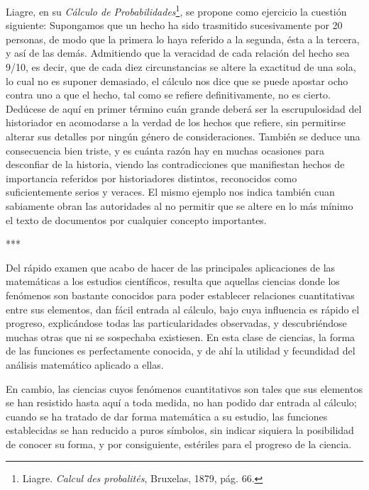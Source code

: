 \documentclass[a4paper, 12pt]{article}
\begin{document}
Liagre, en su {\it Cálculo de Probabilidades}\footnote{Liagre. {\it Calcul des probalités}, Bruxelas, 1879, pág. 66.}, se propone como ejercicio la cuestión siguiente: Supongamos que un hecho ha sido trasmitido sucesivamente por 20 personas, de modo que la primera lo haya referido a la segunda, ésta a la tercera, y así de las demás. Admitiendo que la veracidad de cada relación del hecho sea 9/10, es decir, que de cada diez circunstancias se altere la exactitud de una sola, lo cual no es suponer demasiado, el cálculo nos dice que se puede apostar ocho contra uno a que el hecho, tal como se refiere definitivamente, no es cierto. Dedúcese de aquí en primer término cuán grande deberá ser la escrupulosidad del historiador en acomodarse a la verdad de los hechos que refiere, sin permitirse alterar sus detalles por ningún género de consideraciones. También se deduce una consecuencia bien triste, y es cuánta razón hay en muchas ocasiones para desconfiar de la historia, viendo las contradicciones que manifiestan hechos de importancia referidos por historiadores distintos, reconocidos como suficientemente serios y veraces. El mismo ejemplo nos indica también cuan sabiamente obran las autoridades al no permitir que se altere en lo más mínimo el texto de documentos por cualquier concepto importantes.

\bigskip

\centerline{***}


Del rápido examen que acabo de hacer de las principales aplicaciones de las matemáticas a los estudios científicos, resulta que aquellas ciencias donde los fenómenos son bastante conocidos para poder establecer relaciones cuantitativas entre sus elementos, dan fácil entrada al cálculo, bajo cuya influencia es rápido el progreso, explicándose todas las particularidades observadas, y descubriéndose muchas otras que ni se sospechaba existiesen. En esta clase de ciencias, la forma de las funciones es perfectamente conocida, y de ahí la utilidad y fecundidad del análisis matemático aplicado a ellas.

En cambio, las ciencias cuyos fenómenos cuantitativos son tales que sus elementos se han resistido hasta aquí a toda medida, no han podido dar entrada al cálculo; cuando se ha tratado de dar forma matemática a su estudio, las funciones establecidas se han reducido a puros símbolos, sin indicar siquiera la posibilidad de conocer su forma, y por consiguiente, estériles para el progreso de la ciencia.
\end{document}
